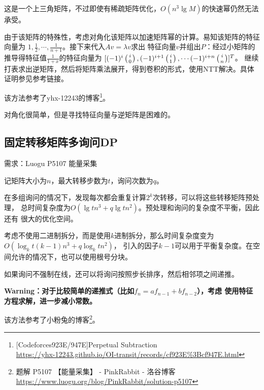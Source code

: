 这是一个上三角矩阵，不过即使有稀疏矩阵优化，$O(n^3\lg M)$的快速幂仍然无法承受。

由于该矩阵的特殊性，考虑对角化该矩阵以加速矩阵幂的计算。易知该矩阵的特征向量为
$1,\frac{1}{2},\cdots,\frac{1}{n+1}$。接下来代入$Av=\lambda v$求出
特征向量$v$并组出$P$：经过小矩阵的推导得特征值$\frac{1}{1+x}$的特征向量为
$[(-1)^i\left(i \atop 0\right),(-1)^{i+1}\left(i \atop 1\right),\cdots (-1)^{i+n}\left(i \atop n\right)]^T$。
继续打表求出逆矩阵，然后将矩阵乘法展开，得到卷积的形式，使用NTT解决。具体证明参见参考链接。

该方法参考了yhx-12243的博客\footnote{
    [Codeforces923E/947E]Perpetual Subtraction\\
    \url{https://yhx-12243.github.io/OI-transit/records/cf923E\%3Bcf947E.html}
}。

对角化很简单，但是寻找特征向量与逆矩阵是困难的。
\subsection{固定转移矩阵多询问DP}
需求：Luogu P5107 能量采集

记矩阵大小为$n$，最大转移步数为$t$，询问次数为$q$。

在多组询问的情况下，发现每次都会重复计算$2^k$次转移，可以将这些转移矩阵预处理，
总时间复杂度为$O(\lg tn^3+q\lg tn^2)$。预处理和询问的复杂度不平衡，因此还有
很大的优化空间。

考虑不使用二进制拆分，而是使用$k$进制拆分，那么时间复杂度变为$O(\log_k t(k-1)n^3+q\log_k tn^2)$，
引入的因子$k-1$可以用于平衡复杂度。在空间允许的情况下，也可以使用根号分块。

如果询问不强制在线，还可以将询问按照步长排序，然后相邻项之间递推。

{\bfseries Warning：对于比较简单的递推式（比如$f_n=af_{n-1}+bf_{n-2}$），考虑
使用特征方程求解，进一步减小常数。}

该方法参考了小粉兔的博客\footnote{
    题解 P5107 【能量采集】 - PinkRabbit - 洛谷博客\\
    \url{https://www.luogu.org/blog/PinkRabbit/solution-p5107}
}。
